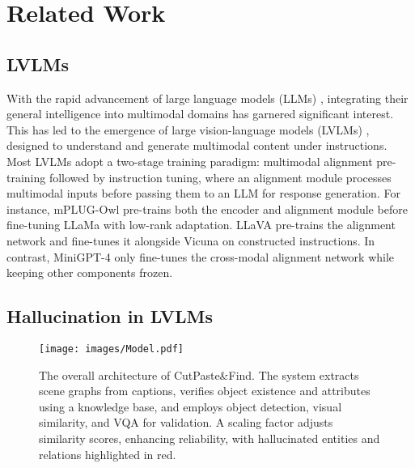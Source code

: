 \section{Related Work}

\subsection{LVLMs}

With the rapid advancement of large language models (LLMs) \cite{ouyang2022training, zhao2023survey,pan2024fallacy,wu2024akew,wu2024antileak,wu2024fastopic,wu2024survey},
integrating their general intelligence into multimodal domains has garnered significant interest. This has led to the emergence of large vision-language models (LVLMs) \cite{ye2023mplug, zhu2023minigpt, liu2023llava, li2023otter, dai2305instructblip, bai2023qwen}, designed to understand and generate multimodal content under instructions. Most LVLMs adopt a two-stage training paradigm: multimodal alignment pre-training followed by instruction tuning, where an alignment module processes multimodal inputs before passing them to an LLM for response generation. For instance, mPLUG-Owl \cite{ye2023mplug} pre-trains both the encoder and alignment module before fine-tuning LLaMa \cite{touvron2023llama} with low-rank adaptation. LLaVA \cite{liu2023llava} pre-trains the alignment network and fine-tunes it alongside Vicuna \cite{chiang2023vicuna} on constructed instructions. In contrast, MiniGPT-4 \cite{zhu2023minigpt} only fine-tunes the cross-modal alignment network while keeping other components frozen.
\subsection{Hallucination in LVLMs}


\begin{figure*}[t]
    

    \centering
    \texttt{[image: images/Model.pdf]}
    \caption{The overall architecture of CutPaste\&Find. The system extracts scene graphs from captions, verifies object existence and attributes using a knowledge base, and employs object detection, visual similarity, and VQA for validation. A scaling factor adjusts similarity scores, enhancing reliability, with hallucinated entities and relations highlighted in red. }
    \label{fig:model}
   \vspace{-10pt}
\end{figure*}

